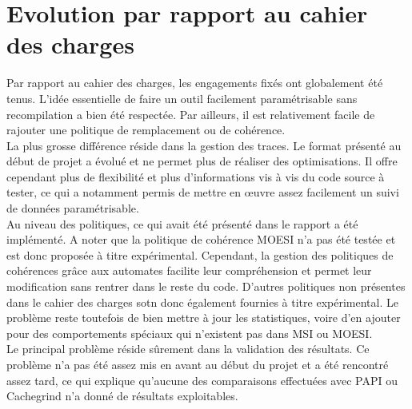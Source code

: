 \newpage
\section{Evolution par rapport au cahier des charges}
Par rapport au cahier des charges, les engagements fixés ont globalement été tenus. L'idée essentielle de faire un outil facilement paramétrisable sans recompilation a bien été respectée. Par ailleurs, il est relativement facile de rajouter une politique de remplacement ou de cohérence. \\ 

La plus grosse différence réside dans la gestion des traces. Le format présenté au début de projet a évolué et ne permet plus de réaliser des optimisations. Il offre cependant plus de flexibilité et plus d'informations vis à vis du code source à tester, ce qui a notamment permis de mettre en {\oe}uvre assez facilement un suivi de données paramétrisable. \\

Au niveau des politiques, ce qui avait été présenté dans le rapport a été implémenté. A noter que la politique de cohérence MOESI n'a pas été testée et est donc proposée à titre expérimental. Cependant, la gestion des politiques de cohérences grâce aux automates facilite leur compréhension et permet leur modification sans rentrer dans le reste du code. D'autres politiques non présentes dans le cahier des charges sotn donc également fournies à titre expérimental. Le problème reste toutefois de bien mettre à jour les statistiques, voire d'en ajouter pour des comportements spéciaux qui n'existent pas dans MSI ou MOESI. \\

Le principal problème réside sûrement dans la validation des résultats. Ce problème n'a pas été assez mis en avant au début du projet et a été rencontré assez tard, ce qui explique qu'aucune des comparaisons effectuées avec \textsf{PAPI} ou \textsf{Cachegrind} n'a donné de résultats exploitables.
